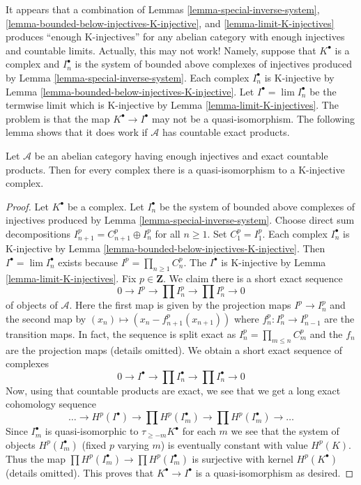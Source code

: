\begin{remark}
\label{remark-difficulty-K-injectives}
It appears that a combination of
Lemmas \ref{lemma-special-inverse-system},
\ref{lemma-bounded-below-injectives-K-injective}, and
\ref{lemma-limit-K-injectives}
produces ``enough K-injectives'' for any abelian category with enough
injectives and countable limits. Actually, this may not work!
Namely, suppose that $K^\bullet$ is a complex and $I_n^\bullet$ is the
system of bounded above complexes of injectives produced by
Lemma \ref{lemma-special-inverse-system}.
Each complex $I_n^\bullet$ is K-injective by
Lemma \ref{lemma-bounded-below-injectives-K-injective}.
Let $I^\bullet = \lim I_n^\bullet$ be the termwise limit which is
K-injective by
Lemma \ref{lemma-limit-K-injectives}.
The problem is that the map $K^\bullet \to I^\bullet$ may not be a
quasi-isomorphism. The following lemma shows that it does work if
$\mathcal{A}$ has countable exact products.
\end{remark}

\begin{lemma}
\label{lemma-enough-K-injectives-Ab4-star}
Let $\mathcal{A}$ be an abelian category having enough injectives
and exact countable products. Then for every complex
there is a quasi-isomorphism to a K-injective complex.
\end{lemma}

\begin{proof}
Let $K^\bullet$ be a complex. Let $I_n^\bullet$ be the
system of bounded above complexes of injectives produced by
Lemma \ref{lemma-special-inverse-system}.
Choose direct sum decompositions $I_{n + 1}^p = C_{n + 1}^p \oplus I_n^p$
for all $n \geq 1$. Set $C_1^p = I_1^p$.
Each complex $I_n^\bullet$ is K-injective by
Lemma \ref{lemma-bounded-below-injectives-K-injective}.
Then $I^\bullet = \lim I_n^\bullet$ exists because
$I^p = \prod_{n \geq 1} C_n^p$.
The $I^\bullet$ is K-injective by
Lemma \ref{lemma-limit-K-injectives}.
Fix $p \in \mathbf{Z}$. We claim there is a short exact sequence
$$
0 \to I^p \to \prod I_n^p \to \prod I_n^p \to 0
$$
of objects of $\mathcal{A}$. Here the first map is given by
the projection maps $I^p \to I_n^p$ and the second map
by $(x_n) \mapsto (x_n - f^p_{n + 1}(x_{n + 1}))$ where
$f^p_n : I_n^p \to I_{n - 1}^p$ are the transition maps.
In fact, the sequence is split exact as
$I_n^p = \prod_{m \leq n} C_m^p$ and the $f_n$ are the projection maps
(details omitted). We obtain a short exact sequence of complexes
$$
0 \to I^\bullet \to \prod I_n^\bullet \to \prod I_n^\bullet \to 0
$$
Now, using that countable products are exact, we see that
we get a long exact cohomology sequence
$$
\ldots \to 
H^p(I^\bullet) \to
\prod H^p(I_m^\bullet) \to
\prod H^p(I_m^\bullet) \to \ldots
$$
Since $I_m^\bullet$ is quasi-isomorphic to $\tau_{\geq -m}K^\bullet$ for each
$m$ we see that the system of objects $H^p(I_m^\bullet)$ (fixed $p$ varying $m$)
is eventually constant with value $H^p(K)$. Thus the map
$\prod H^p(I_m^\bullet) \to \prod H^p(I_m^\bullet)$ is surjective with
kernel $H^p(K^\bullet)$ (details omitted). This proves that
$K^\bullet \to I^\bullet$ is a quasi-isomorphism as desired.
\end{proof}

